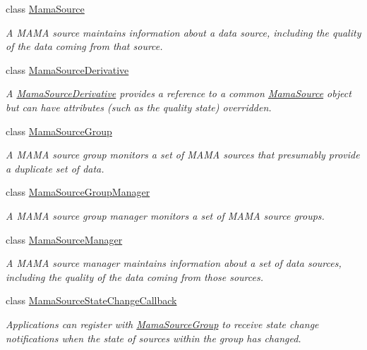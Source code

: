\begin{DoxyCompactItemize}
class \hyperlink{classWombat_1_1MamaSource}{MamaSource}
\begin{DoxyCompactList}\small\item\em A MAMA source maintains information about a data source, including the quality of the data coming from that source. \item\end{DoxyCompactList}\item 
class \hyperlink{classWombat_1_1MamaSourceDerivative}{MamaSourceDerivative}
\begin{DoxyCompactList}\small\item\em A \hyperlink{classWombat_1_1MamaSourceDerivative}{MamaSourceDerivative} provides a reference to a common \hyperlink{classWombat_1_1MamaSource}{MamaSource} object but can have attributes (such as the quality state) overridden. \item\end{DoxyCompactList}\item 
class \hyperlink{classWombat_1_1MamaSourceGroup}{MamaSourceGroup}
\begin{DoxyCompactList}\small\item\em A MAMA source group monitors a set of MAMA sources that presumably provide a duplicate set of data. \item\end{DoxyCompactList}\item 
class \hyperlink{classWombat_1_1MamaSourceGroupManager}{MamaSourceGroupManager}
\begin{DoxyCompactList}\small\item\em A MAMA source group manager monitors a set of MAMA source groups. \item\end{DoxyCompactList}\item 
class \hyperlink{classWombat_1_1MamaSourceManager}{MamaSourceManager}
\begin{DoxyCompactList}\small\item\em A MAMA source manager maintains information about a set of data sources, including the quality of the data coming from those sources. \item\end{DoxyCompactList}\item 
class \hyperlink{classWombat_1_1MamaSourceStateChangeCallback}{MamaSourceStateChangeCallback}
\begin{DoxyCompactList}\small\item\em Applications can register with \hyperlink{classWombat_1_1MamaSourceGroup}{MamaSourceGroup} to receive state change notifications when the state of sources within the group has changed. \item\end{DoxyCompactList}\item 

\end{DoxyCompactItemize}
